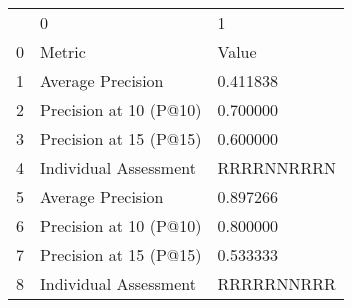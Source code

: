 \begin{tabular}{lll}
 & 0 & 1 \\
0 & Metric & Value \\
1 & Average Precision & 0.411838 \\
2 & Precision at 10 (P@10) & 0.700000 \\
3 & Precision at 15 (P@15) & 0.600000 \\
4 & Individual Assessment & RRRRNNRRRN \\
5 & Average Precision & 0.897266 \\
6 & Precision at 10 (P@10) & 0.800000 \\
7 & Precision at 15 (P@15) & 0.533333 \\
8 & Individual Assessment & RRRRRNNRRR \\
\end{tabular}

